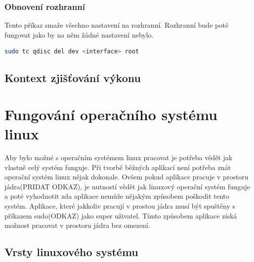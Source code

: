 \subsection*{Obnovení rozhranní}
Tento příkaz smaže všechno nastavení na rozhranní. Rozhranní bude poté fungovat jako by na něm žádné nastavení nebylo.
\begin{lstlisting}[language=bash]
    sudo tc qdisc del dev <interface> root
\end{lstlisting}


\section{Kontext zjišťování výkonu}

\chapter{Fungování operačního systému linux}

Aby bylo možné s operačním systémem linux pracovat je potřeba vědět jak vlastně celý systém funguje. Při tvorbě běžných aplikací není potřeba
znát operační systém linux nějak dokonale. Ovšem pokud aplikace pracuje v prostoru jádra(PRIDAT ODKAZ), je nutností vědět jak linuxový operační
systém funguje a poté vyhodnotit zda aplikace nemůže nějakým způsobem poškodit tento systém. Aplikace, které jakkoliv pracují v prostou
jádra musí být spuštěny s příkazem sudo(ODKAZ) jako super uživatel. Tímto způsobem aplikace získá možnost pracovat v prostoru jádra bez
omezení.

\section{Vrsty linuxového systému}

